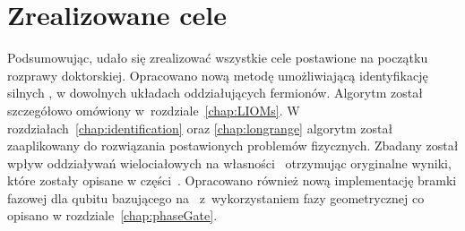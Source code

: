 \ornament


\section*{Zrealizowane cele}


Podsumowując, udało się zrealizować wszystkie cele postawione na początku rozprawy doktorskiej.
Opracowano nową metodę umożliwiającą identyfikację silnych \MZM, w dowolnych układach oddziałujących fermionów.
Algorytm został szczegółowo omówiony w~rozdziale~\ref{chap:LIOMs}.
W rozdziałach~\ref{chap:identification} oraz \ref{chap:longrange} algorytm został zaaplikowany do rozwiązania postawionych problemów fizycznych.
Zbadany został wpływ oddziaływań wielociałowych na własności \MZM\ otrzymując oryginalne wyniki, które zostały opisane w części~\hyperref[part:III]{}.
Opracowano również nową implementację bramki fazowej dla qubitu bazującego na \MZM\ z~wykorzystaniem fazy geometrycznej co opisano w rozdziale~\ref{chap:phaseGate}.

